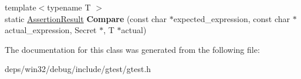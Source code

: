 \begin{DoxyCompactItemize}
\item 
\hypertarget{classtesting_1_1internal_1_1_eq_helper_3_01true_01_4_ab38e840297adb48f18767a1a99187fb3}{}{\footnotesize template$<$typename T $>$ }\\static \hyperlink{classtesting_1_1_assertion_result}{Assertion\+Result} {\bfseries Compare} (const char $\ast$expected\+\_\+expression, const char $\ast$actual\+\_\+expression, Secret $\ast$, T $\ast$actual)\label{classtesting_1_1internal_1_1_eq_helper_3_01true_01_4_ab38e840297adb48f18767a1a99187fb3}

\end{DoxyCompactItemize}


The documentation for this class was generated from the following file\+:\begin{DoxyCompactItemize}
\item 
deps/win32/debug/include/gtest/gtest.\+h\end{DoxyCompactItemize}
